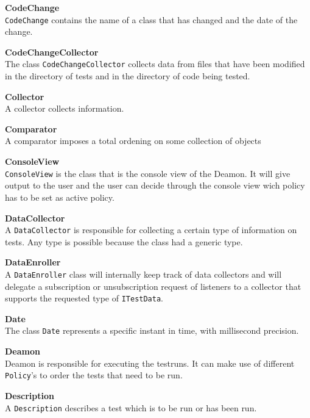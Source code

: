 \documentclass[i2]{oss}
\newcommand{\class}[1]{\texttt{#1}}
\newcommand{\gloss}[1]{\textbf{#1}}
\begin{document}
\begin{description}
\item \gloss{CodeChange}\\
\class{CodeChange} contains the name of a class that has changed and the date of the change.

\item \gloss{CodeChangeCollector}\\
The class \class{CodeChangeCollector} collects data from files that have been modified in the directory of tests and in the directory of code being tested. 
	

\item \gloss{Collector}\\
A collector collects information.

\item \gloss{Comparator}\\
A comparator imposes a total ordening on some collection of objects

\item \gloss{ConsoleView}\\
\class{ConsoleView} is the class that is the console view of the Deamon. It will give output to the user and the user can decide through the console view wich policy has to be set as active policy.

\item \gloss{DataCollector}\\
A \class{DataCollector} is responsible for collecting a certain type of information on tests. Any type is possible because the class had a generic type.

\item \gloss{DataEnroller}\\
A \class{DataEnroller} class will internally keep track of data collectors and will delegate a subscription or unsubscription request of listeners to a collector that supports the requested type of \class{ITestData}.

\item \gloss{Date}\\
The class \class{Date} represents a specific instant in time, with millisecond precision.

\item \gloss{Deamon} \\
	Deamon is responsible for executing the testruns. It can make use of different \class{Policy}'s to order the tests that need to be run.

\item \gloss{Description} \\ A \class{Description} describes a test which is to be run or has been run. 


\end{description}
\end{document}
